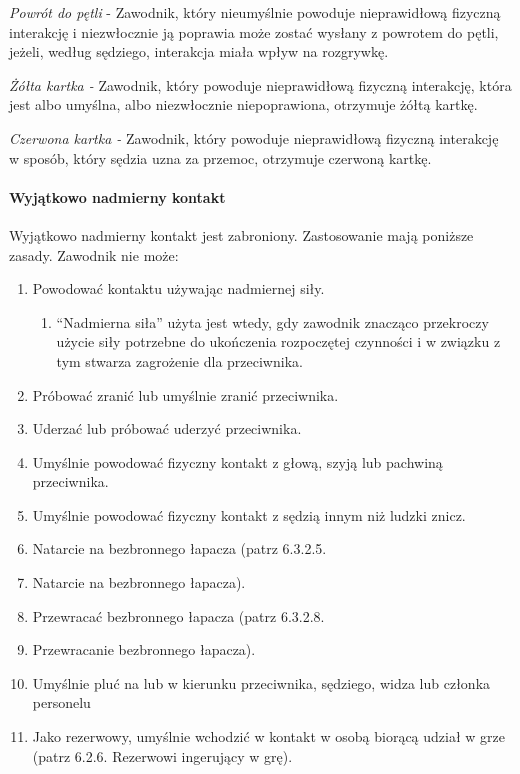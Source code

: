 \documentclass[12pt]{article}
\begin{document}
\emph{Powrót do pętli} - Zawodnik, który nieumyślnie powoduje
nieprawidłową fizyczną interakcję i niezwłocznie ją poprawia może zostać
wysłany z powrotem do pętli, jeżeli, według sędziego, interakcja miała
wpływ na rozgrywkę.

\emph{Żółta kartka -} Zawodnik, który powoduje nieprawidłową fizyczną
interakcję, która jest albo umyślna, albo niezwłocznie niepoprawiona,
otrzymuje żółtą kartkę.

\emph{Czerwona kartka -} Zawodnik, który powoduje nieprawidłową fizyczną
interakcję w sposób, który sędzia uzna za przemoc, otrzymuje czerwoną
kartkę.

\paragraph{Wyjątkowo nadmierny kontakt}
Wyjątkowo nadmierny
kontakt jest zabroniony. Zastosowanie mają poniższe zasady. Zawodnik nie
może:

\begin{enumerate}
\item
    Powodować kontaktu używając nadmiernej siły.
  
  \begin{enumerate}
  \item
        ``Nadmierna siła'' użyta jest wtedy, gdy zawodnik znacząco
    przekroczy użycie siły potrzebne do ukończenia rozpoczętej czynności
    i w związku z tym stwarza zagrożenie dla przeciwnika.
      \end{enumerate}
\item
    Próbować zranić lub umyślnie zranić przeciwnika.
  \item
    Uderzać lub próbować uderzyć przeciwnika.
  \item
    Umyślnie powodować fizyczny kontakt z głową, szyją lub pachwiną
  przeciwnika.
  \item
    Umyślnie powodować fizyczny kontakt z sędzią innym niż ludzki znicz.
  \item
    Natarcie na bezbronnego łapacza (patrz 6.3.2.5.\item Natarcie na
  bezbronnego łapacza).
  \item
    Przewracać bezbronnego łapacza (patrz 6.3.2.8.\item Przewracanie
  bezbronnego łapacza).
  \item
    Umyślnie pluć na lub w kierunku przeciwnika, sędziego, widza lub
  członka personelu
  \item
    Jako rezerwowy, umyślnie wchodzić w kontakt w osobą biorącą udział w
  grze (patrz 6.2.6. Rezerwowi ingerujący w grę).
  \end{enumerate}
\end{document}
